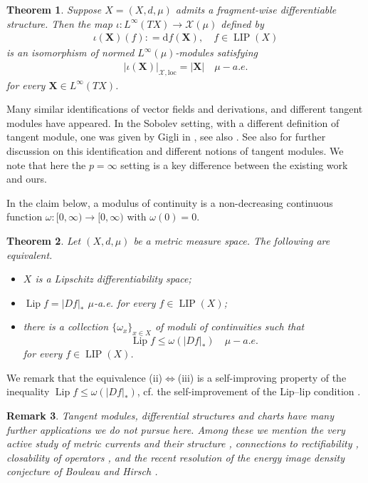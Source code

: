 \documentclass{amsart}
\newtheorem{theorem}{Theorem}[section]
\newtheorem{remark}[theorem]{Remark}
\numberwithin{equation}{section}
\newcommand{\Lip}{\operatorname{Lip}}
\newcommand{\LIP}{\operatorname{LIP}}
\newcommand{\ud}{\mathrm {d}}
\newcommand{\defl}{\mathrel{\mathop:}=}
\newcommand{\loc}{\mathrm{loc}}
\begin{document}
\begin{theorem}\label{thm:weaver-der}
	Suppose $X=(X,d,\mu)$ admits a fragment-wise differentiable structure. Then the map $\iota:L^\infty(TX)\to \mathcal X(\mu)$ defined by
	\begin{align*}
		\iota(\bm X)(f)\defl \ud f(\bm X),\quad f\in\LIP(X)
	\end{align*}
	is an isomorphism of normed $L^\infty(\mu)$-modules satisfying
	\begin{align}\label{eq:isom}
		|\iota(\bm X)|_{\mathcal X,\loc}=|\bm X| \quad\mu-a.e.
	\end{align}
	for every $\bm X\in L^\infty(TX)$. 
\end{theorem}
Many similar identifications of vector fields and derivations, and different tangent modules have appeared. In the Sobolev setting, with a different definition of tangent module, one was given by Gigli in \cite[Theorem 2.3.3]{gig18}, see also \cite[Theorem 4.2.3]{gigenr}. See also \cite{AIDP2} for further discussion on this identification and different notions of tangent modules. We note that here the $p=\infty$ setting is a key difference between the existing work and ours.

In the claim below, a modulus of continuity is a non-decreasing continuous function $\omega:[0,\infty)\to [0,\infty)$ with $\omega(0)=0$.
\begin{theorem}\label{thm:LDS-char}
	Let $(X,d,\mu)$ be a metric measure space. The following are equivalent.
	\begin{itemize}
		\item[(i)] $X$ is a Lipschitz differentiability space;
		\item[(ii)] $\Lip f=|Df|_{\ast}$ $\mu$-a.e. for every $f\in \LIP(X)$;
		\item[(iii)] there is a collection $\{\omega_x\}_{x\in X}$ of moduli of continuities such that \[\Lip f\le \omega(|Df|_\ast)\quad \mu-a.e.\] for every $f\in \LIP(X)$.
	\end{itemize}
\end{theorem}

We remark that the equivalence (ii)$\iff$(iii) is a self-improving property of the inequality $\Lip f\le \omega(|Df|_\ast)$, cf. the self-improvement of the Lip--lip condition \cite{sch16b,che-kle-sch16}. 

\begin{remark}
    Tangent modules, differential structures and charts have many further applications we do not pursue here. Among these we mention the very active study of metric currents and their structure \cite{sch16, almarflat,wil12}, connections to rectifiability \cite{marchesemerlo,schulli}, closability of operators \cite{bateclosability, pasqualetto20}, and the recent resolution of the energy image density conjecture of Bouleau and Hirsch \cite{eidconj}. 
\end{remark}
\end{document}

